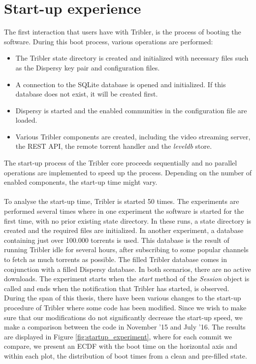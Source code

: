 \section{Start-up experience}
The first interaction that users have with Tribler, is the process of booting the software. During this boot process, various operations are performed:
\begin{itemize}
	\item The Tribler state directory is created and initialized with necessary files such as the Dispersy key pair and configuration files.
	\item A connection to the SQLite database is opened and initialized. If this database does not exist, it will be created first.
	\item Dispersy is started and the enabled communities in the configuration file are loaded.
	\item Various Tribler components are created, including the video streaming server, the REST API, the remote torrent handler and the \emph{leveldb} store.
\end{itemize}
The start-up process of the Tribler core proceeds sequentially and no parallel operations are implemented to speed up the process. Depending on the number of enabled components, the start-up time might vary.\\\\
To analyse the start-up time, Tribler is started 50 times. The experiments are performed several times where in one experiment the software is started for the first time, with no prior existing state directory. In these runs, a state directory is created and the required files are initialized. In another experiment, a database containing just over 100.000 torrents is used. This database is the result of running Tribler idle for several hours, after subscribing to some popular channels to fetch as much torrents as possible. The filled Tribler database comes in conjunction with a filled Dispersy database. In both scenarios, there are no active downloads. The experiment starts when the \emph{start} method of the \emph{Session} object is called and ends when the notification that Tribler has started, is observed. During the span of this thesis, there have been various changes to the start-up procedure of Tribler where some code has been modified. Since we wish to make sure that our modifications do not significantly decrease the start-up speed, we make a comparison between the code in November '15 and July '16. The results are displayed in Figure \ref{fig:startup_experiment}, where for each commit we compare, we present an ECDF with the boot time on the horizontal axis and within each plot, the distribution of boot times from a clean and pre-filled state.\\

